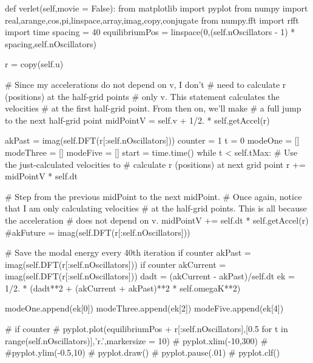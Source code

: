 \begin{enumerate}
\begin{codeexample}
\begin{VerbatimOut}{\listingFile}
    def verlet(self,movie = False):
        from matplotlib import pyplot
        from numpy import real,arange,cos,pi,linspace,array,imag,copy,conjugate
        from numpy.fft import rfft
        import time
        spacing = 40
        equilibriumPos = linspace(0,(self.nOscillators - 1) * spacing,self.nOscillators)

        r = copy(self.u)

        # Since my accelerations do not depend on v, I don't
        # need to calculate r (positions) at the half-grid points
        # only v.  This statement calculates the velocities
        # at the first half-grid point.  From then on, we'll make
        # a full jump to the next half-grid point
        midPointV = self.v + 1/2. * self.getAccel(r)

        akPast = imag(self.DFT(r[:self.nOscillators]))
        counter = 1
        t = 0
        modeOne = []
        modeThree = []
        modeFive = []
        start = time.time()
        while t < self.tMax:
            # Use the just-calculated velocities to
            # calculate r (positions) at next grid point
            r += midPointV * self.dt
            
            # Step from the previous midPoint to the next midPoint.
            # Once again, notice that I am only calculating velocities
            # at the half-grid points.  This is all because the acceleration
            # does not depend on v.
            midPointV +=  self.dt * self.getAccel(r)
            #akFuture = imag(self.DFT(r[:self.nOscillators]))
            

            # Save the modal energy every 40th iteration
            if counter %
                akPast = imag(self.DFT(r[:self.nOscillators]))
            if counter %
                akCurrent = imag(self.DFT(r[:self.nOscillators]))
                dadt = (akCurrent - akPast)/self.dt
                ek = 1/2. * (dadt**2 + (akCurrent + akPast)**2  * self.omegaK**2)
                       
                modeOne.append(ek[0])
                modeThree.append(ek[2])
                modeFive.append(ek[4])


#            if counter %
#                pyplot.plot(equilibriumPos + r[:self.nOscillators],[0.5 for t in range(self.nOscillators)],'r.',markersize = 10)
#                pyplot.xlim(-10,300)
#                #pyplot.ylim(-0.5,10)
#                pyplot.draw()
#                pyplot.pause(.01)
#                pyplot.clf()


\end{VerbatimOut}
\end{codeexample}
\end{enumerate}
